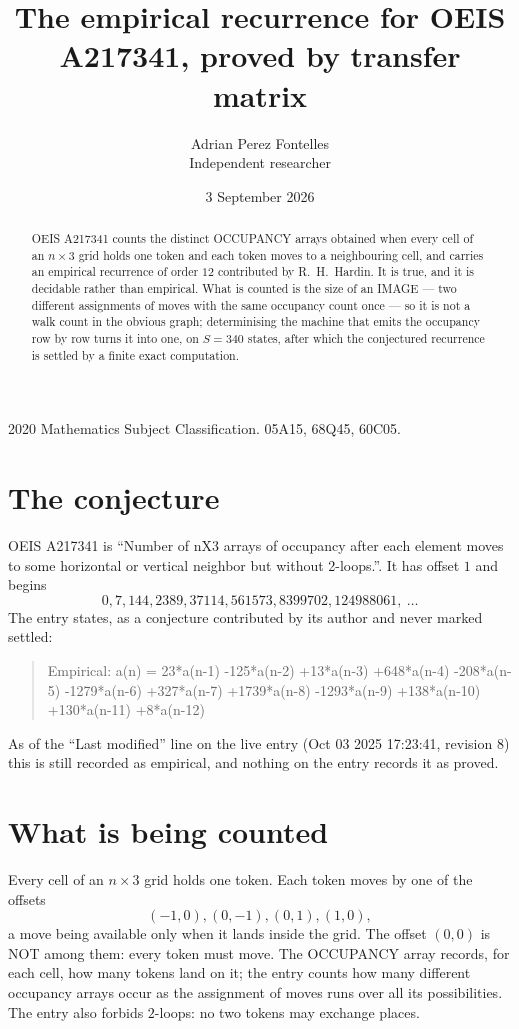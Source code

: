 \documentclass[11pt,a4paper]{article}
\title{The empirical recurrence for OEIS A217341, proved by transfer matrix}
\author{Adrian Perez Fontelles\\ \small Independent researcher}
\date{3 September 2026}
\theoremstyle{plain}
\theoremstyle{definition}
\begin{document}
\maketitle

\begin{abstract}
OEIS A217341 counts the distinct OCCUPANCY arrays obtained when every cell of an $n\times3$ grid
holds one token and each token moves to a neighbouring cell, and carries an empirical
recurrence of order $12$ contributed by R.~H.~Hardin. It is true, and it is decidable
rather than empirical. What is counted is the size of an IMAGE --- two different assignments of
moves with the same occupancy count once --- so it is not a walk count in the obvious graph;
determinising the machine that emits the occupancy row by row turns it into one, on $S=340$
states, after which the conjectured recurrence is settled by a finite exact computation.
\end{abstract}

\noindent\small 2020 Mathematics Subject Classification. 05A15, 68Q45, 60C05.\normalsize

\section{The conjecture}

OEIS A217341 is ``Number of nX3 arrays of occupancy after each element moves to some horizontal or vertical neighbor but without 2-loops.''. It has offset $1$ and begins
\[
0, 7, 144, 2389, 37114, 561573, 8399702, 124988061,\ \dots
\]
The entry states, as a conjecture contributed by its author and never marked settled:
\begin{quote}
Empirical: a(n) = 23*a(n-1) -125*a(n-2) +13*a(n-3) +648*a(n-4) -208*a(n-5) -1279*a(n-6) +327*a(n-7) +1739*a(n-8) -1293*a(n-9) +138*a(n-10) +130*a(n-11) +8*a(n-12)
\end{quote}
As of the ``Last modified'' line on the live entry (Oct 03 2025 17:23:41, revision 8) this is still
recorded as empirical, and nothing on the entry records it as proved.

\section{What is being counted}

Every cell of an $n\times3$ grid holds one token. Each token moves by one of the offsets
\[
(-1,0), (0,-1), (0,1), (1,0),
\]
a move being available only when it lands inside the grid. The offset $(0,0)$ is NOT among them: every token must move. The OCCUPANCY array
records, for each cell, how many tokens land on it; the entry counts how many different
occupancy arrays occur as the assignment of moves runs over all its possibilities. The entry also forbids $2$-loops: no two tokens may exchange places.
\end{document}

